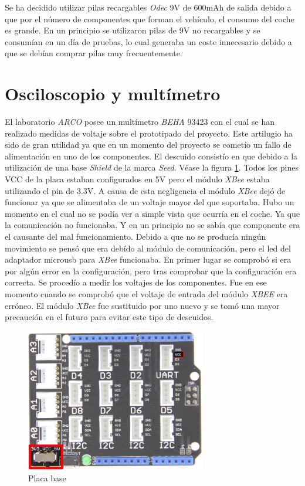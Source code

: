 Se ha decidido utilizar pilas recargables \emph{Odec} 9V de 600mAh de salida debido a que por el número de componentes que forman el vehículo, el consumo del coche es grande. En un principio se utilizaron pilas de 9V no recargables y se consumían en un día de pruebas, lo cual generaba un coste innecesario debido a que se debían comprar pilas muy frecuentemente.

\section{Osciloscopio y multímetro}

El laboratorio \emph{ARCO} posee un multímetro \emph{BEHA} 93423 con el cual se han realizado medidas de voltaje sobre el prototipado del proyecto. Este artilugio ha sido de gran utilidad ya que en un momento del proyecto se cometío un fallo de alimentación en uno de los componentes. El descuido consistío en que debido a la utilización de una base \emph{Shield} de la marca \emph{Seed}. Véase la figura \ref{fig:Shield}. Todos los pines VCC de la placa estaban configurados en 5V pero el módulo \emph{XBee} estaba utilizando el pin de 3.3V. A causa de esta negligencia el módulo \emph{XBee} dejó de funcionar ya que se alimentaba de un voltaje mayor del que soportaba. Hubo un momento en el cual no se podía ver a simple vista que ocurría en el coche. Ya que la comunicación no funcionaba. Y en un principio no se sabía que componente era el causante del mal funcionamiento. Debido a que no se producía ningún movimiento se pensó que era debído al módulo de comunicación, pero el led del adaptador microusb para \emph{XBee} funcionaba.  En primer lugar se comprobó si era por algún error en la configuración, pero tras comprobar que la configuración era correcta. Se procedío a medir los voltajes de los componentes. Fue en ese momento cuando se comprobó que el voltaje de entrada del módulo \emph{XBEE} era erróneo. El módulo \emph{XBee} fue sustituido por uno nuevo y se tomó una mayor precaución en el futuro para evitar este tipo de descuidos.

\begin{figure}[hbtp]
 \centering
   \includegraphics[width=0.7\textwidth]{./figures/shield.png}
 \caption{Placa base}
 \label{fig:Shield}
\end{figure}

